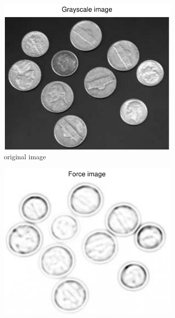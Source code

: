 \documentclass[11pt,a4paper]{article}
\begin{document}
\begin{figure}[H]
    \centering
    \begin{subfigure}[t]{0.21\textwidth}
        \includegraphics[width=\textwidth]{src/images/coins_log_gray.pdf}
        \caption{original image}
        \label{fig:coins_log_original}
    \end{subfigure}
    \begin{subfigure}[t]{0.21\textwidth}
        \includegraphics[width=\textwidth]{src/images/coins_log_forces.pdf}

\end{subfigure}
\end{figure}
\end{document}
